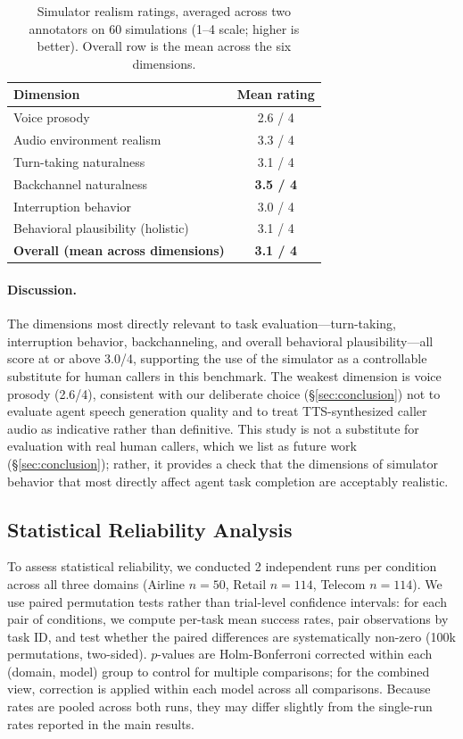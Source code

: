 \begin{table}[h]
\caption{Simulator realism ratings, averaged across two annotators on 60 simulations (1--4 scale; higher is better). Overall row is the mean across the six dimensions.}
\label{tab:simulator-realism}
\centering
\begin{small}
\begin{tabular}{@{}lc@{}}
\toprule
\textbf{Dimension} & \textbf{Mean rating} \\
\midrule
Voice prosody & 2.6 / 4 \\
Audio environment realism & 3.3 / 4 \\
Turn-taking naturalness & 3.1 / 4 \\
Backchannel naturalness & \textbf{3.5 / 4} \\
Interruption behavior & 3.0 / 4 \\
Behavioral plausibility (holistic) & 3.1 / 4 \\
\midrule
\textbf{Overall (mean across dimensions)} & \textbf{3.1 / 4} \\
\bottomrule
\end{tabular}
\end{small}
\end{table}

\paragraph{Discussion.} The dimensions most directly relevant to task evaluation---turn-taking, interruption behavior, backchanneling, and overall behavioral plausibility---all score at or above 3.0/4, supporting the use of the simulator as a controllable substitute for human callers in this benchmark. The weakest dimension is voice prosody (2.6/4), consistent with our deliberate choice (\S\ref{sec:conclusion}) not to evaluate agent speech generation quality and to treat TTS-synthesized caller audio as indicative rather than definitive. This study is not a substitute for evaluation with real human callers, which we list as future work (\S\ref{sec:conclusion}); rather, it provides a check that the dimensions of simulator behavior that most directly affect agent task completion are acceptably realistic.%

\subsection{Statistical Reliability Analysis}
\label{app:stat-sig}

To assess statistical reliability, we conducted 2 independent runs per condition across all three domains (Airline $n=50$, Retail $n=114$, Telecom $n=114$). We use paired permutation tests rather than trial-level confidence intervals: for each pair of conditions, we compute per-task mean success rates, pair observations by task ID, and test whether the paired differences are systematically non-zero (100k permutations, two-sided). $p$-values are Holm-Bonferroni corrected within each (domain, model) group to control for multiple comparisons; for the combined view, correction is applied within each model across all comparisons. Because rates are pooled across both runs, they may differ slightly from the single-run rates reported in the main results.%

